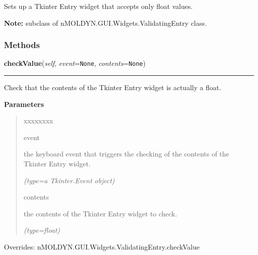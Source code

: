 Sets up a Tkinter Entry widget that accepts only float values.

\textbf{Note:} subclass of nMOLDYN.GUI.Widgets.ValidatingEntry class.





  \subsubsection{Methods}

    \vspace{0.5ex}

\hspace{.8\funcindent}\begin{boxedminipage}{\funcwidth}

    \raggedright \textbf{checkValue}(\textit{self}, \textit{event}={\tt None}, \textit{contents}={\tt None})

    \vspace{-1.5ex}

    \rule{\textwidth}{0.5\fboxrule}
\setlength{\parskip}{2ex}
    Check that the contents of the Tkinter Entry widget is actually a 
    float.

\setlength{\parskip}{1ex}
      \textbf{Parameters}
      \vspace{-1ex}

      \begin{quote}
        \begin{Ventry}{xxxxxxxx}

          \item[event]

          the keyboard event that triggers the checking of the contents of 
          the Tkinter Entry widget.

            {\it (type=a Tkinter.Event object)}

          \item[contents]

          the contents of the Tkinter Entry widget to check.

            {\it (type=float)}

        \end{Ventry}

      \end{quote}

      Overrides: nMOLDYN.GUI.Widgets.ValidatingEntry.checkValue

    \end{boxedminipage}

